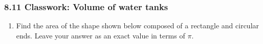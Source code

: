 \documentclass[12pt, twoside]{article}
\begin{document}
\subsubsection*{8.11 Classwork: Volume of water tanks}
 \begin{enumerate}

  \item Find the area of the shape shown below composed of a rectangle and circular ends. Leave your answer as an exact value in terms of $\pi$.
  \begin{flushright}
\end{flushright}\vspace{1cm}

\end{enumerate}
\end{document}
